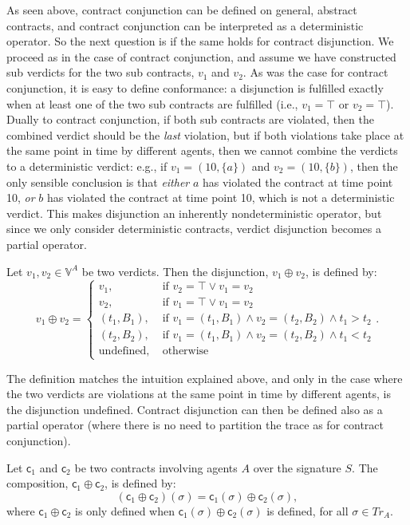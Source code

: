 \documentclass[orivec,final]{llncs-href}
\newcommand{\traceset}[1]{\mathit{Tr}_{#1}}
\newcommand{\verdictset}[1]{\mathbb{V}^{#1}}
\newcommand{\trace}{\sigma}
\newcommand{\conforming}{\top}
\newcommand{\contract}{\mathsf{c}}
\begin{document}
As seen above, contract conjunction can be defined on general,
abstract contracts, and contract conjunction can be interpreted
as a deterministic operator. So the next question is if the same holds
for contract disjunction. We proceed as in the case of contract
conjunction, and assume we have constructed sub verdicts for the two
sub contracts, $v_1$ and $v_2$. As was the case for contract
conjunction, it is easy to define conformance: a disjunction is
fulfilled exactly when at least one of the two sub contracts are 
fulfilled (i.e., $v_1 = \conforming$ or $v_2 = \conforming$). Dually
to contract conjunction, if both sub contracts are violated, then the
combined verdict should be the \emph{last} violation, but if both
violations take place at the same point in time by different agents,
then we cannot combine the verdicts to a deterministic verdict: e.g.,
if $v_1 = (10,\{a\})$ and $v_2 = (10,\{b\})$, then the only sensible
conclusion is that \emph{either} $a$ has violated the contract at time
point 10, \emph{or} $b$ has violated the contract at time point 10,
which is not a deterministic verdict. This makes disjunction an
inherently nondeterministic operator, but since we only consider
deterministic contracts, verdict disjunction becomes a partial
operator.
\begin{definition}
  Let $v_1,v_2 \in \verdictset{A}$ be two verdicts. Then the
  disjunction, $v_1 \oplus v_2$, is  defined by:
  \[
  v_1 \oplus v_2 = \left\{
    \begin{array}{ll}
      v_1, &\mbox{ if } v_2 = \conforming \lor v_1 = v_2\\
      v_2, &\mbox{ if } v_1 = \conforming \lor v_1 = v_2\\
      (t_1,B_1), & \mbox{ if } v_1 = (t_1,B_1) \land v_2 = (t_2,B_2)
      \land t_1 > t_2\\
      (t_2,B_2), & \mbox{ if } v_1 = (t_1,B_1) \land v_2 = (t_2,B_2)
      \land t_1 < t_2\\
      \mbox{undefined}, & \mbox{ otherwise}
    \end{array}
  \right. .
  \]
\end{definition}

The definition matches the intuition explained above, and only in the
case where the two verdicts are violations at the same point in time
by different agents, is the disjunction undefined. Contract
disjunction can then be defined also as a partial operator (where
there is no need to partition the trace as for contract conjunction).
\begin{definition}\label{def:contractdisjunction}
  Let $\contract_1$ and $\contract_2$ be two contracts involving
  agents $A$ over the signature $S$. The composition, $\contract_1
  \oplus \contract_2$, is defined by:
  \[
  (\contract_1 \oplus  \contract_2)(\trace) =
  \contract_1(\trace) \oplus \contract_2(\trace),
  \]
  where $\contract_1 \oplus \contract_2$ is only defined when
  $\contract_1(\trace) \oplus \contract_2(\trace)$ is defined, for all
  $\trace \in \traceset{A}$.
\end{definition}
\end{document}
